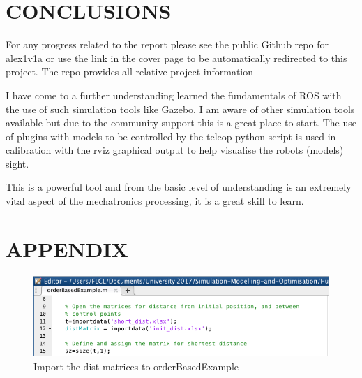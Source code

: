 \documentclass[a4paper, 10pt]{IEEEconf}
\begin{document}



\section{CONCLUSIONS}

For any progress related to the report please see the public Github repo for alex1v1a or use the link in the cover page to be automatically redirected to this project. The repo provides all relative project information

I have come to a further understanding learned the fundamentals of ROS with the use of such simulation tools like Gazebo. I am aware of other simulation tools available but due to the community support this is a great place to start. The use of plugins with models to be controlled by the teleop python script is used in calibration with the rviz graphical output to help visualise the robots (models) sight.

This is a powerful tool and from the basic level of understanding is an extremely vital aspect of the mechatronics processing, it is a great skill to learn.


%
%


%
\section*{APPENDIX}

\begin{figure}[H]
  \includegraphics[width=\linewidth, center]{images/import}
  \caption{Import the dist matrices to orderBasedExample}
  \label{fig:Import the dist matrices to orderBasedExample}
\end{figure}
\end{document}
